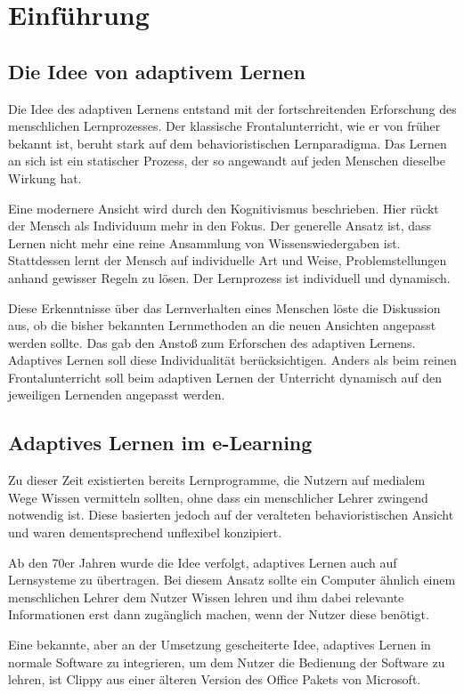 \chapter{Einführung}

\section{Die Idee von adaptivem Lernen}
Die Idee des adaptiven Lernens entstand mit der fortschreitenden
Erforschung des menschlichen Lernprozesses.
Der klassische Frontalunterricht, wie er von früher bekannt ist,
beruht stark auf dem behavioristischen Lernparadigma.
Das Lernen an sich ist ein statischer Prozess, der so angewandt
auf jeden Menschen dieselbe Wirkung hat.

Eine modernere Ansicht wird durch den Kognitivismus
beschrieben. Hier rückt der Mensch als Individuum mehr in den Fokus.
Der generelle Ansatz ist, dass Lernen nicht mehr eine reine
Ansammlung von Wissenswiedergaben ist. Stattdessen lernt der Mensch
auf individuelle Art und Weise, Problemstellungen anhand gewisser Regeln zu lösen.
Der Lernprozess ist individuell und dynamisch.

Diese Erkenntnisse über das Lernverhalten eines Menschen löste die Diskussion aus,
ob die bisher bekannten Lernmethoden an die neuen Ansichten angepasst werden sollte.
Das gab den Anstoß zum Erforschen des adaptiven Lernens.
Adaptives Lernen soll diese Individualität berücksichtigen.
Anders als beim reinen Frontalunterricht soll beim adaptiven Lernen
der Unterricht dynamisch auf den jeweiligen Lernenden angepasst werden.

\section{Adaptives Lernen im e-Learning}
Zu dieser Zeit existierten bereits Lernprogramme, die Nutzern
auf medialem Wege Wissen vermitteln sollten, ohne dass ein menschlicher Lehrer
zwingend notwendig ist. Diese basierten jedoch auf der veralteten behavioristischen
Ansicht und waren dementsprechend unflexibel konzipiert.

Ab den 70er Jahren wurde die Idee verfolgt, adaptives Lernen auch auf Lernsysteme
zu übertragen. Bei diesem Ansatz sollte ein Computer ähnlich einem menschlichen Lehrer
dem Nutzer Wissen lehren und ihm dabei relevante Informationen erst dann zugänglich machen,
wenn der Nutzer diese benötigt.

Eine bekannte, aber an der Umsetzung gescheiterte Idee, adaptives Lernen
in normale Software zu integrieren, um dem Nutzer die Bedienung der Software zu lehren,
ist \glqq Clippy\grqq{} aus einer älteren Version des Office Pakets von Microsoft.

